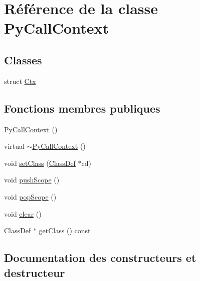 \hypertarget{class_py_call_context}{}\section{Référence de la classe Py\+Call\+Context}
\label{class_py_call_context}
\subsection*{Classes}
\begin{DoxyCompactItemize}
\item 
struct \hyperlink{struct_py_call_context_1_1_ctx}{Ctx}
\end{DoxyCompactItemize}
\subsection*{Fonctions membres publiques}
\begin{DoxyCompactItemize}
\item 
\hyperlink{class_py_call_context_a85ce0716da78f11dfd52f5b05a5f6fb2}{Py\+Call\+Context} ()
\item 
virtual \hyperlink{class_py_call_context_ab1534cc5c2a49a559383165fba1513ad}{$\sim$\+Py\+Call\+Context} ()
\item 
void \hyperlink{class_py_call_context_a5aa0259d9af92a26ca91c9ae9eaafa50}{set\+Class} (\hyperlink{class_class_def}{Class\+Def} $\ast$cd)
\item 
void \hyperlink{class_py_call_context_ad91c5d2cf8278cd9bfb95644dff22428}{push\+Scope} ()
\item 
void \hyperlink{class_py_call_context_a07828922123391baa0bb455ea053e98d}{pop\+Scope} ()
\item 
void \hyperlink{class_py_call_context_a4ed1bfbe6c61ae48b4c65452d9f245d3}{clear} ()
\item 
\hyperlink{class_class_def}{Class\+Def} $\ast$ \hyperlink{class_py_call_context_ad977a74e48e2a4ca964f0209a10b079b}{get\+Class} () const 
\end{DoxyCompactItemize}


\subsection{Documentation des constructeurs et destructeur}
\hypertarget{class_py_call_context_a85ce0716da78f11dfd52f5b05a5f6fb2}{}

